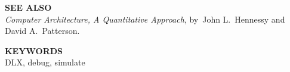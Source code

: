\begin{mylist}
\item[{\bf SEE ALSO}]
\nopagebreak \hfill \\
{\em Computer Architecture, A Quantitative Approach}, by~John L.~Hennessy and David A.~Patterson.

\item[{\bf KEYWORDS}]
\nopagebreak \hfill \\
DLX, debug, simulate

\end{mylist}
